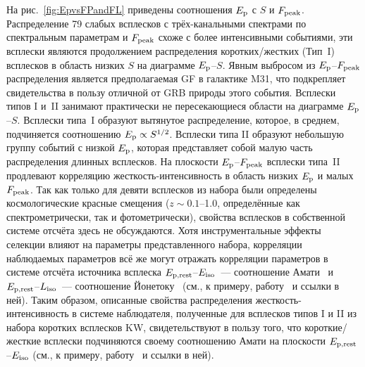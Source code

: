 На рис.~\ref{fig:EpvsFPandFL} приведены соотношения $E_{\mathrm{p}}$ с $S$ и $F_{\mathrm{peak}}$.
Распределение 79 слабых всплесков с трёх-канальными спектрами по спектральным параметрам 
и $F_{\mathrm{peak}}$ схоже с более интенсивными событиями, эти всплески являются продолжением
распределения коротких/жестких (Тип~I) всплесков в область низких $S$  на диаграмме $E_{\mathrm{p}}$--$S$.
Явным выбросом из  $E_{\mathrm{p}}$--$F_{\mathrm{peak}}$ распределения является предполагаемая 
GF в галактике M31, что подкрепляет свидетельства в пользу отличной от GRB природы этого события.
Всплески типов I и~II занимают практически не пересекающиеся области на диаграмме $E_{\mathrm{p}}$--$S$.
Всплески типа~I образуют вытянутое распределение, которое, в среднем, подчиняется 
соотношению $E_{\mathrm{p}} \propto S^{1/2}$. Всплески типа II образуют небольшую группу событий
с низкой $E_{\mathrm{p}}$, которая представляет собой малую часть распределения длинных всплесков.
На плоскости $E_{\mathrm{p}}$--$F_{\mathrm{peak}}$ всплески типа~II продлевают корреляцию 
жесткость-интенсивность в область низких $E_{\mathrm{p}}$ и малых $F_{\mathrm{peak}}$.
Так как только для девяти всплесков из набора были определены космологические 
красные смещения ($z\sim 0.1$--1.0, определённые как спектрометрически, так и
фотометрически), свойства всплесков в собственной системе отсчёта здесь не обсуждаются.
Хотя инструментальные эффекты селекции влияют на параметры представленного набора,
корреляции наблюдаемых параметров всё же могут отражать корреляции параметров 
в системе отсчёта источника всплеска $E_{\mathrm{p,rest}}$--$E_{\mathrm{iso}}$~--- 
соотношение Амати~\citep{Amati_2002AandA} и $E_{\mathrm{p,rest}}$--$L_{\mathrm{iso}}$~--- 
соотношение Йонетоку~\citep{Yonetoku_2004ApJ}
(см., к примеру, работу~\citep{Nava_2008MNRAS} и ссылки в ней).
Таким образом, описанные свойства распределения жесткость-интенсивность 
в системе наблюдателя, полученные для всплесков типов I и II из набора коротких 
всплесков KW, свидетельствуют в пользу того, что короткие/жесткие всплески подчиняются 
своему соотношению Амати на плоскости $E_{\mathrm{p,rest}}$--$E_{\mathrm{iso}}$
(см., к примеру, работу~\citep{Nava_2011MNRAS} и ссылки в ней).

